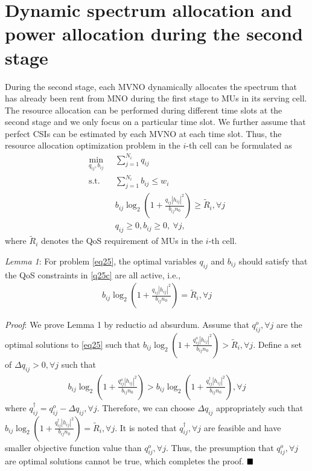 \documentclass[journal]{IEEEtran}
\begin{document}
\section{Dynamic spectrum allocation and power allocation during the second stage}
During the second stage, each MVNO dynamically allocates the spectrum that has already been rent from MNO during the first stage to MUs in its serving cell. The resource allocation can be performed during different time slots at the second stage and we only focus on a particular time slot. We further assume that perfect CSIs can be estimated by each MVNO at each time slot. Thus, the resource allocation optimization problem in the $i$-th cell can be formulated as
\begin{subequations}\label{eq25}
	\begin{align}
	\min_{q_{ij}, b_{ij}}\ & \sum\limits_{j = 1}^{N_i} q_{ij} \label{q25a} \\ \mbox{s.t.} \quad &  \sum\limits_{j = 1}^{N_i} b_{ij} \leq w_i \label{q25b} \\ \quad &  b_{ij}\log_2\left(1 + \frac{q_{ij}\left|h_{ij}\right|^2}{b_{ij}n_0}\right) \geq \tilde{R}_i, \forall j \label{q25c}\\
	& q_{ij} \geq 0, b_{ij} \geq 0, \ \forall j, \label{q25d}
	\end{align}
\end{subequations}
where $\tilde{R}_i$ denotes the QoS requirement of MUs in the $i$-th cell.

\textit{Lemma 1}: For problem \eqref{eq25}, the optimal variables $q_{ij}$ and $b_{ij}$ should satisfy that the QoS constraints in \eqref{q25c} are all active, i.e., 
\begin{align} \label{q26}
b_{ij}\log_2\left(1 + \frac{q_{ij}\left|h_{ij}\right|^2}{b_{ij}n_0}\right) = \tilde{R}_i,  \forall j
\end{align}

\textit{Proof}:  
We prove Lemma 1 by reductio ad absurdum. Assume that $q_{ij}^o, \forall j$ are the optimal solutions to \eqref{eq25} such that $b_{ij}\log_2\left(1 + \frac{q_{ij}^o\left|h_{ij}\right|^2}{b_{ij}n_0}\right) > \tilde{R}_i, \forall j$. Define a set of $\Delta q_{ij} > 0, \forall j$ such that 
\begin{align}
b_{ij}\log_2\left(1 + \frac{q_{ij}^o\left|h_{ij}\right|^2}{b_{ij}n_0}\right) > b_{ij}\log_2\left(1 + \frac{q_{ij}^\dag\left|h_{ij}\right|^2}{b_{ij}n_0}\right), \forall j
\end{align}
where $q_{ij}^\dag = q_{ij}^o - \Delta q_{ij}, \forall j$. Therefore, we can choose $\Delta q_{ij}$ appropriately such that $b_{ij}\log_2\left(1 + \frac{q_{ij}^\dag\left|h_{ij}\right|^2}{b_{ij}n_0}\right) = \tilde{R}_i, \forall j$. It is noted that $q_{ij}^\dag, \forall j$ are feasible and have smaller objective function value than $q_{ij}^o, \forall j$. Thus, the presumption that $q_{ij}^o, \forall j$ are optimal solutions cannot be true, which completes the proof.
$\hfill\blacksquare$
\end{document}
